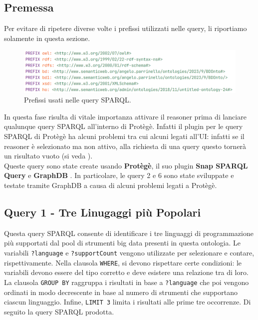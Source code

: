 \subsection{Premessa}
Per evitare di ripetere diverse volte i prefissi utilizzati nelle query, li riportiamo solamente in questa sezione.

\begin{figure}[H]
    \centering
    \includegraphics[width=15cm]{docs/images/prefix.PNG}
    \caption{Prefissi usati nelle query SPARQL.}
    \label{fig:prefix}
\end{figure}
In questa fase risulta di vitale importanza attivare il reasoner prima di lanciare qualunque query SPARQL all'interno di Protègè. Infatti il plugin per le query SPARQL di Protègè ha alcuni problemi tra cui alcuni legati all'UI: infatti se il reasoner è selezionato ma non attivo, alla richiesta di una query questo tornerà un risultato vuoto (si veda \cite{sparqluibug}).\\

Queste query sono state create usando \textbf{Protègè}, il suo plugin \textbf{Snap SPARQL Query} \cite{snapsparqlquery} e \textbf{GraphDB} \cite{graphdbhomepage}. In particolare, le query 2 e 6 sono state sviluppate e testate tramite GraphDB a causa di alcuni problemi legati a Protègè.
\newpage
\subsection{Query 1 - Tre Linugaggi più Popolari}
Questa query SPARQL consente di identificare i tre linguaggi di programmazione più supportati dal pool di strumenti big data presenti in questa ontologia. Le variabili \texttt{?language} e \texttt{?supportCount} vengono utilizzate per selezionare e contare, rispettivamente. Nella clausola \texttt{WHERE}, si devono rispettare certe condizioni: le variabili devono essere del tipo corretto e deve esistere una relazione tra di loro. La clausola \texttt{GROUP BY} raggruppa i risultati in base a \texttt{?language} che poi vengono ordinati in modo decrescente in base al numero di strumenti che supportano ciascun linguaggio. Infine, \texttt{LIMIT 3} limita i risultati alle prime tre occorrenze. Di seguito la query SPARQL prodotta.\\

